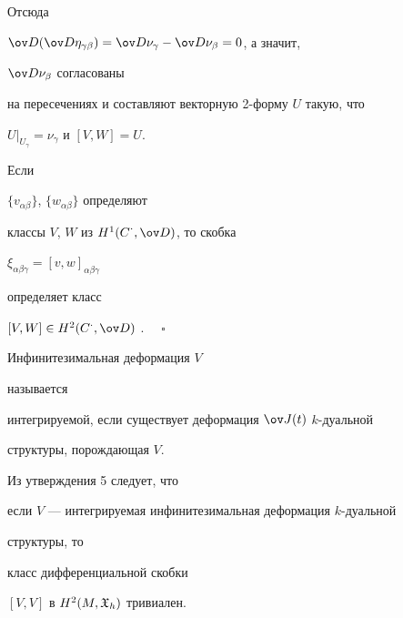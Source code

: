 Отсюда


$\ov D (\ov D \eta_{\gamma \beta})=\ov D \nu_{\gamma}


- \ov D \nu_{\beta}=0$, а значит,


$\ov D \nu_{\beta}$ согласованы


на пересечениях и составляют векторную 2-форму $U$ такую, что


$U |_{U_{\gamma}}=\nu_{\gamma}$ и $[V,W]=U$.


Если


$\{v_{\alpha \beta} \}$, $\{w_{\alpha \beta} \}$ определяют


классы $V$, $W $ из $ H^1(C^{\displaystyle\cdot}, \ov D)$, то скобка


$\xi_{\alpha \beta \gamma}=[v, w]_{\alpha \beta \gamma}$


определяет класс


$[V,W] \in H^2(C^{\cdot}, \ov D)$ \cite{Kodaira}. $\quad\square$





\begin{defn}


Инфинитезимальная деформация $V$


называется


интегрируемой, если существует деформация $\ov J(t)$ $k$-дуальной


структуры, порождающая $V$.


\end{defn}





Из утверждения 5 следует, что


если $V$ --- интегрируемая инфинитезимальная деформация $k$-дуальной


структуры, то


класс дифференциальной скобки


$[V, V]$ в $H^2 ({M},{\frak X}_h)$ тривиален.






